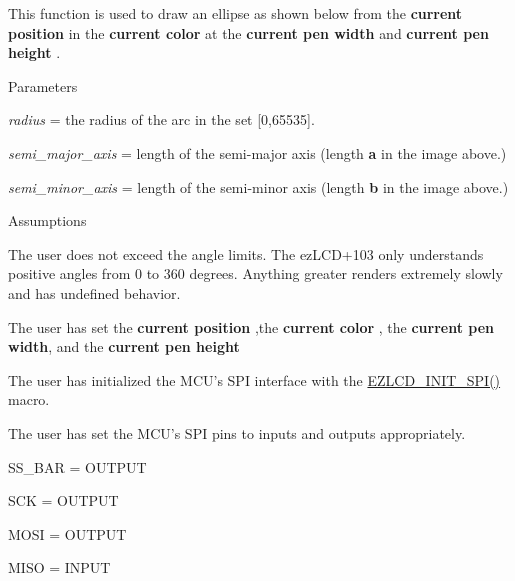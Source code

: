 This function is used to draw an ellipse as shown below from the {\bfseries  current position } in the {\bfseries  current color } at the {\bfseries  current pen width } and {\bfseries  current pen height }.  \begin{DoxyParagraph}{Parameters}

\begin{DoxyItemize}
\item {\itshape radius} = the radius of the arc in the set \mbox{[}0,65535\mbox{]}.
\item {\itshape semi\-\_\-major\-\_\-axis} = length of the semi-\/major axis (length {\bfseries a} in the image above.)
\item {\itshape semi\-\_\-minor\-\_\-axis} = length of the semi-\/minor axis (length {\bfseries b} in the image above.)
\end{DoxyItemize}
\end{DoxyParagraph}
\begin{DoxyParagraph}{Assumptions}

\begin{DoxyItemize}
\item The user does not exceed the angle limits. The ez\-L\-C\-D+103 only understands positive angles from 0 to 360 degrees. Anything greater renders extremely slowly and has undefined behavior.
\item The user has set the {\bfseries current position },the {\bfseries current color }, the {\bfseries current pen width}, and the {\bfseries current pen height}
\item The user has initialized the M\-C\-U's S\-P\-I interface with the \hyperlink{group__ez_l_c_d__103__common_gaf5c3b2dedc950d34e0381946fbb32428}{E\-Z\-L\-C\-D\-\_\-\-I\-N\-I\-T\-\_\-\-S\-P\-I()} macro.
\item The user has set the M\-C\-U's S\-P\-I pins to inputs and outputs appropriately. \par
\par

\begin{DoxyItemize}
\item S\-S\-\_\-\-B\-A\-R = O\-U\-T\-P\-U\-T
\item S\-C\-K = O\-U\-T\-P\-U\-T
\item M\-O\-S\-I = O\-U\-T\-P\-U\-T
\item M\-I\-S\-O = I\-N\-P\-U\-T 
\end{DoxyItemize}
\end{DoxyItemize}
\end{DoxyParagraph}
